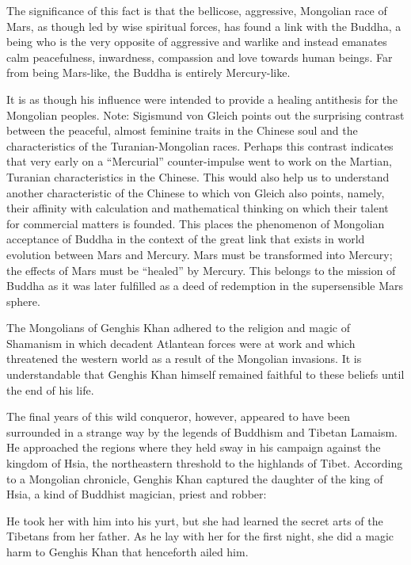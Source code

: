 The significance of this fact is that the bellicose, aggressive, Mongolian race of Mars, as though led by wise spiritual forces, has found a link with the Buddha, a being who is the very opposite of aggressive and warlike and instead emanates calm peacefulness, inwardness, compassion and love towards human beings. Far from being Mars-like, the Buddha is entirely Mercury-like.

It is as though his influence were intended to provide a healing antithesis for the Mongolian peoples. Note: Sigismund von Gleich points out the surprising contrast between the peaceful, almost feminine traits in the Chinese soul and the characteristics of the Turanian-Mongolian races. Perhaps this contrast indicates that very early on a ``Mercurial'' counter-impulse went to work on the Martian, Turanian characteristics in the Chinese. This would also help us to understand another characteristic of the Chinese to which von Gleich also points, namely, their affinity with calculation and mathematical thinking on which their talent for commercial matters is founded. This places the phenomenon of Mongolian acceptance of Buddha in the context of the great link that exists in world evolution between Mars and Mercury. Mars must be transformed into Mercury; the effects of Mars must be ``healed'' by Mercury. This belongs to the mission of Buddha as it was later fulfilled as a deed of redemption in the supersensible Mars sphere.

The Mongolians of Genghis Khan adhered to the religion and magic of Shamanism in which decadent Atlantean forces were at work and which threatened the western world as a result of the Mongolian invasions. It is understandable that Genghis Khan himself remained faithful to these beliefs until the end of his life.

The final years of this wild conqueror, however, appeared to have been surrounded in a strange way by the legends of Buddhism and Tibetan Lamaism. He approached the regions where they held sway in his campaign against the kingdom of Hsia, the northeastern threshold to the highlands of Tibet. According to a Mongolian chronicle, Genghis Khan captured the daughter of the king of Hsia, a kind of Buddhist magician, priest and robber:

\begin{quotex}
He took her with him into his yurt, but she had learned the secret arts of the Tibetans from her father. As he lay with her for the first night, she did a magic harm to Genghis Khan that henceforth ailed him.
\end{quotex}

